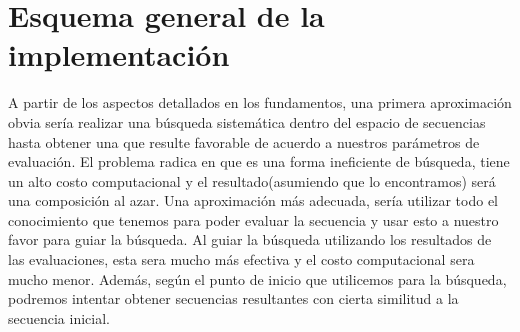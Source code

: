 \section{Esquema general de la implementación}







A partir de los aspectos detallados en los fundamentos, una primera aproximación obvia sería realizar una búsqueda sistemática dentro del espacio 
de secuencias hasta obtener una que resulte favorable de acuerdo a nuestros parámetros de evaluación.  
El problema radica en que es una forma ineficiente de búsqueda, tiene un alto costo computacional y el resultado(asumiendo que lo encontramos) será una composición al azar.
Una aproximación más adecuada,  sería utilizar todo el conocimiento que tenemos para poder evaluar la secuencia y usar esto a nuestro favor para guiar la búsqueda. 
Al guiar la búsqueda utilizando los resultados de las evaluaciones, esta sera mucho más efectiva y el costo computacional sera mucho menor.
Además, según el punto de inicio que utilicemos para la búsqueda, podremos intentar obtener secuencias resultantes con cierta similitud a la secuencia inicial.


 

